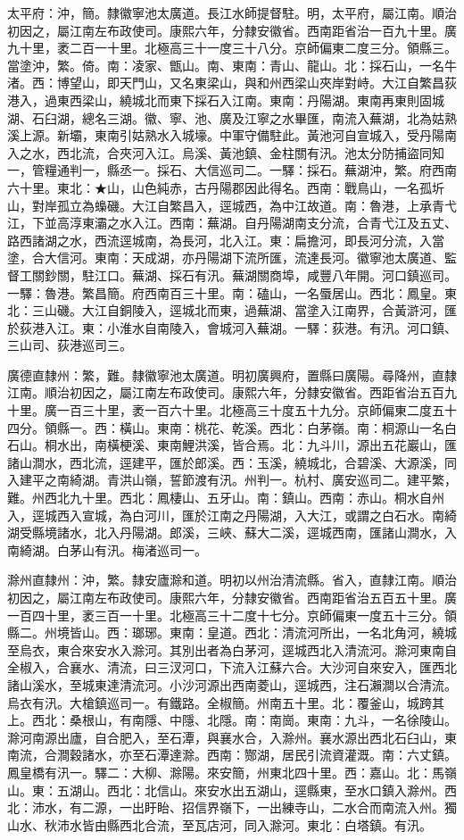 \begin{pinyinscope}
太平府：沖，簡。隸徽寧池太廣道。長江水師提督駐。明，太平府，屬江南。順治初因之，屬江南左布政使司。康熙六年，分隸安徽省。西南距省治一百九十里。廣九十里，袤二百一十里。北極高三十一度三十八分。京師偏東二度三分。領縣三。當塗沖，繁。倚。南：凌家、甑山。南、東南：青山、龍山。北：採石山，一名牛渚。西：博望山，即天門山，又名東梁山，與和州西梁山夾岸對峙。大江自繁昌荻港入，過東西梁山，繞城北而東下採石入江南。東南：丹陽湖。東南再東則固城湖、石臼湖，總名三湖。徽、寧、池、廣及江寧之水畢匯，南流入蕪湖，北為姑熟溪上源。新壩，東南引姑熟水入城壕。中軍守備駐此。黃池河自宣城入，受丹陽南入之水，西北流，合夾河入江。烏溪、黃池鎮、金柱關有汛。池太分防捕盜同知一，管糧通判一，縣丞一。採石、大信巡司二。一驛：採石。蕪湖沖，繁。府西南六十里。東北：★山，山色純赤，古丹陽郡因此得名。西南：戰鳥山，一名孤圻山，對岸孤立為蟂磯。大江自繁昌入，逕城西，為中江故道。南：魯港，上承青弋江，下並高淳東灞之水入江。西南：蕪湖。自丹陽湖南支分流，合青弋江及五丈、路西諸湖之水，西流逕城南，為長河，北入江。東：扁擔河，即長河分流，入當塗，合大信河。東南：天成湖，亦丹陽湖下流所匯，流達長河。徽寧池太廣道、監督工關鈔關，駐江口。蕪湖、採石有汛。蕪湖關商埠，咸豐八年開。河口鎮巡司。一驛：魯港。繁昌簡。府西南百三十里。南：磕山，一名蜃居山。西北：鳳皇。東北：三山磯。大江自銅陵入，逕城北而東，過蕪湖、當塗入江南界，合黃滸河，匯於荻港入江。東：小淮水自南陵入，會城河入蕪湖。一驛：荻港。有汛。河口鎮、三山司、荻港巡司三。

廣德直隸州：繁，難。隸徽寧池太廣道。明初廣興府，置縣曰廣陽。尋降州，直隸江南。順治初因之，屬江南左布政使司。康熙六年，分隸安徽省。西距省治五百九十里。廣一百三十里，袤一百六十里。北極高三十度五十九分。京師偏東二度五十四分。領縣一。西：橫山。東南：桃花、乾溪。西北：白茅嶺。南：桐源山一名白石山。桐水出，南橫梗溪、東南鯉洪溪，皆合焉。北：九斗川，源出五花巖山，匯諸山澗水，西北流，逕建平，匯於郎溪。西：玉溪，繞城北，合碧溪、大源溪，同入建平之南綺湖。青洪山嶺，誓節渡有汛。州判一。杭村、廣安巡司二。建平繁，難。州西北九十里。西北：鳳棲山、五牙山。南：鎮山。西南：赤山。桐水自州入，逕城西入宣城，為白河川，匯於江南之丹陽湖，入大江，或謂之白石水。南綺湖受縣境諸水，北入丹陽湖。郎溪，三峽、蘇大二溪，逕城西南，匯諸山澗水，入南綺湖。白茅山有汛。梅渚巡司一。

滁州直隸州：沖，繁。隸安廬滁和道。明初以州治清流縣。省入，直隸江南。順治初因之，屬江南左布政使司。康熙六年，分隸安徽省。西南距省治五百五十里。廣一百四十里，袤三百一十里。北極高三十二度十七分。京師偏東一度五十三分。領縣二。州境皆山。西：瑯琊。東南：皇道。西北：清流河所出，一名北角河，繞城至烏衣，東合來安水入滁河。其別出者為白茅河，逕城西北入清流河。滁河東南自全椒入，合襄水、清流，曰三汊河口，下流入江蘇六合。大沙河自來安入，匯西北諸山溪水，至城東達清流河。小沙河源出西南菱山，逕城西，注石瀨澗以合清流。烏衣有汛。大槍鎮巡司一。有鐵路。全椒簡。州南五十里。北：覆釜山，城跨其上。西北：桑根山，有南隱、中隱、北隱。南：南崗。東南：九斗，一名徐陵山。滁河南源出廬，自合肥入，至石潭，與襄水合，入滁州。襄水源出西北石臼山，東南流，合澗穀諸水，亦至石潭達滁。西南：酂湖，居民引流資灌溉。南：六丈鎮。鳳皇橋有汛一。驛二：大柳、滁陽。來安簡，州東北四十里。西：嘉山。北：馬嶺山。東：五湖山。西北：北信山。來安水出五湖山，逕縣東，至水口鎮入滁州。西北：沛水，有二源，一出盱眙、招信界嶺下，一出練寺山，二水合而南流入州。獨山水、秋沛水皆由縣西北合流，至瓦店河，同入滁河。東北：白塔鎮。有汛。


\end{pinyinscope}
